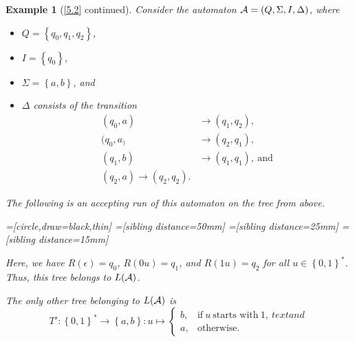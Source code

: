 \documentclass[openany]{scrbook}
\theoremstyle{break}
\theoremstyle{nonumberbreak}
\newtheorem{Example}{Example}
\theoremstyle{nonumberplain}
\theoremstyle{nonumberbreak}
\newcommand{\set}[1]{\left\{#1\right\}}
\begin{document}
\begin{Example}[\cref{5.2} continued]
  Consider the automaton ${\cal A} = (Q, \Sigma, I, \Delta)$, where
  \begin{itemize}
  \item $Q = \set{q_0, q_1, q_2}$,
  \item $I = \set{q_0}$,
  \item $\Sigma = \set{a, b}$, and
  \item $\Delta$ consists of the transition
    \begin{align*}
      (q_0, a) & \to (q_1, q_2), \\
      (q_0, a_) & \to (q_2, q_1), \\
      (q_1, b) & \to (q_1, q_1),\ \text{and} \\
      (q_2, a) \to (q_2, q_2).
    \end{align*}
  \end{itemize}

  The following is an accepting run of this automaton on the tree from
  above.

  =[circle,draw=black,thin]
  =[sibling distance=50mm]
  =[sibling distance=25mm]
  =[sibling distance=15mm]

    Here, we have $R(\epsilon) = q_0$, $R(0u) = q_1$, and $R(1u) =
    q_2$ for all $u \in \set{0, 1}^*$. Thus, this tree belongs to
    $L({\cal A})$.

    The only other tree belonging to $L({\cal A})$ is
    \begin{equation*}
      T': \set{0, 1}^* \to \set{a, b}: u \mapsto
      \begin{cases}
        b, & \text{if}\ u\ \text{starts with}\ 1,\ text{and} \\
        a, & \text{otherwise}.
      \end{cases}
    \end{equation*}
\end{Example}
\end{document}

